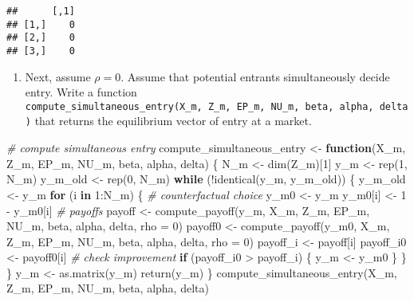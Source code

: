 \documentclass[
]{article}
\newenvironment{Shaded}{\begin{snugshade}}{\end{snugshade}}
\newcommand{\AttributeTok}[1]{\textcolor[rgb]{0.77,0.63,0.00}{#1}}
\newcommand{\CommentTok}[1]{\textcolor[rgb]{0.56,0.35,0.01}{\textit{#1}}}
\newcommand{\ControlFlowTok}[1]{\textcolor[rgb]{0.13,0.29,0.53}{\textbf{#1}}}
\newcommand{\DecValTok}[1]{\textcolor[rgb]{0.00,0.00,0.81}{#1}}
\newcommand{\FunctionTok}[1]{\textcolor[rgb]{0.00,0.00,0.00}{#1}}
\newcommand{\NormalTok}[1]{#1}
\newcommand{\OtherTok}[1]{\textcolor[rgb]{0.56,0.35,0.01}{#1}}
\newcommand{\SpecialCharTok}[1]{\textcolor[rgb]{0.00,0.00,0.00}{#1}}
\providecommand{\tightlist}{%
  \setlength{\itemsep}{0pt}\setlength{\parskip}{0pt}}
\begin{document}
\begin{verbatim}
##      [,1]
## [1,]    0
## [2,]    0
## [3,]    0
\end{verbatim}

\begin{enumerate}
\def\labelenumi{\arabic{enumi}.}
\setcounter{enumi}{5}
\tightlist
\item
  Next, assume \(\rho = 0\). Assume that potential entrants
  simultaneously decide entry. Write a function
  \texttt{compute\_simultaneous\_entry(X\_m,\ Z\_m,\ EP\_m,\ NU\_m,\ beta,\ alpha,\ delta)}
  that returns the equilibrium vector of entry at a market.
\end{enumerate}

\begin{Shaded}
\begin{Highlighting}[]
\CommentTok{\# compute simultaneous entry}
\NormalTok{compute\_simultaneous\_entry }\OtherTok{\textless{}{-}}
  \ControlFlowTok{function}\NormalTok{(X\_m, Z\_m, EP\_m, NU\_m, beta, alpha, delta) \{}
\NormalTok{    N\_m }\OtherTok{\textless{}{-}} \FunctionTok{dim}\NormalTok{(Z\_m)[}\DecValTok{1}\NormalTok{]}
\NormalTok{    y\_m }\OtherTok{\textless{}{-}} \FunctionTok{rep}\NormalTok{(}\DecValTok{1}\NormalTok{, N\_m)}
\NormalTok{    y\_m\_old }\OtherTok{\textless{}{-}} \FunctionTok{rep}\NormalTok{(}\DecValTok{0}\NormalTok{, N\_m)}
    \ControlFlowTok{while}\NormalTok{ (}\SpecialCharTok{!}\FunctionTok{identical}\NormalTok{(y\_m, y\_m\_old)) \{}
\NormalTok{      y\_m\_old }\OtherTok{\textless{}{-}}\NormalTok{ y\_m}
      \ControlFlowTok{for}\NormalTok{ (i }\ControlFlowTok{in} \DecValTok{1}\SpecialCharTok{:}\NormalTok{N\_m) \{}
        \CommentTok{\# counterfactual choice}
\NormalTok{        y\_m0 }\OtherTok{\textless{}{-}}\NormalTok{ y\_m}
\NormalTok{        y\_m0[i] }\OtherTok{\textless{}{-}} \DecValTok{1} \SpecialCharTok{{-}}\NormalTok{ y\_m0[i]}
        \CommentTok{\# payoffs}
\NormalTok{        payoff }\OtherTok{\textless{}{-}} \FunctionTok{compute\_payoff}\NormalTok{(y\_m, X\_m, Z\_m, EP\_m, NU\_m, beta, alpha, delta, }\AttributeTok{rho =} \DecValTok{0}\NormalTok{)}
\NormalTok{        payoff0 }\OtherTok{\textless{}{-}} \FunctionTok{compute\_payoff}\NormalTok{(y\_m0, X\_m, Z\_m, EP\_m, NU\_m, beta, alpha, delta, }\AttributeTok{rho =} \DecValTok{0}\NormalTok{)}
\NormalTok{        payoff\_i }\OtherTok{\textless{}{-}}\NormalTok{ payoff[i]}
\NormalTok{        payoff\_i0 }\OtherTok{\textless{}{-}}\NormalTok{ payoff0[i]}
        \CommentTok{\# check improvement}
        \ControlFlowTok{if}\NormalTok{ (payoff\_i0 }\SpecialCharTok{\textgreater{}}\NormalTok{ payoff\_i) \{}
\NormalTok{          y\_m }\OtherTok{\textless{}{-}}\NormalTok{ y\_m0}
\NormalTok{        \}}
\NormalTok{      \}}
\NormalTok{    \}}
\NormalTok{    y\_m }\OtherTok{\textless{}{-}} \FunctionTok{as.matrix}\NormalTok{(y\_m)}
    \FunctionTok{return}\NormalTok{(y\_m)}
\NormalTok{  \}}
\FunctionTok{compute\_simultaneous\_entry}\NormalTok{(X\_m, Z\_m, EP\_m, NU\_m, beta, alpha, delta)}
\end{Highlighting}
\end{Shaded}
\end{document}
